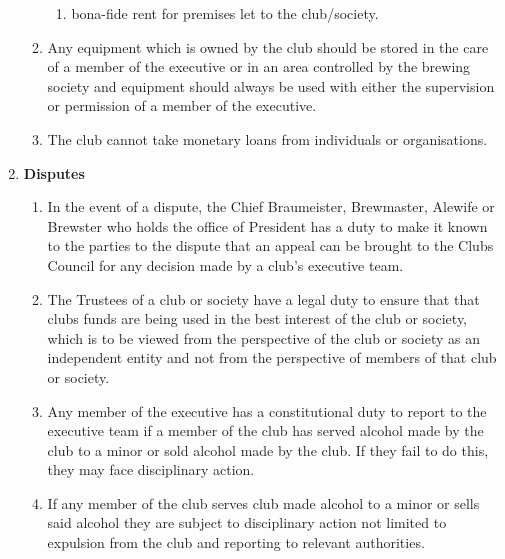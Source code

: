 \documentclass{article}
\begin{document}
\begin{enumerate}[label=\textbf{\arabic*}]
\begin{enumerate}[label=2.\arabic*]
\begin{enumerate}[label=\alph*.]
            \item bona-fide rent for premises let to the club/society.
        \end{enumerate}
        \item Any equipment which is owned by the club should be stored in the care of a member of the executive or in an area controlled by the brewing society and equipment should always be used with either the supervision or permission of a member of the executive.
        \item The club cannot take monetary loans from individuals or organisations. 
    \end{enumerate}

    \item \textbf{Disputes}
    \begin{enumerate}[label=3.\arabic*]
        \item In the event of a dispute, the Chief Braumeister, Brewmaster, Alewife or Brewster who holds the office of President has a duty to make it known to the parties to the dispute that an appeal can be brought to the Clubs Council for any decision made by a club’s executive team.
        \item The Trustees of a club or society have a legal duty to ensure that that clubs funds are being used in the best interest of the club or society, which is to be viewed from the perspective of the club or society as an independent entity and not from the perspective of members of that club or society.
        \item Any member of the executive has a constitutional duty to report to the executive team if a member of the club has served alcohol made by the club to a minor or sold alcohol made by the club. If they fail to do this, they may face disciplinary action.
        \item If any member of the club serves club made alcohol to a minor or sells said alcohol they are subject to disciplinary action not limited to expulsion from the club and reporting to relevant authorities.
    \end{enumerate}


\end{enumerate}
\end{document}
